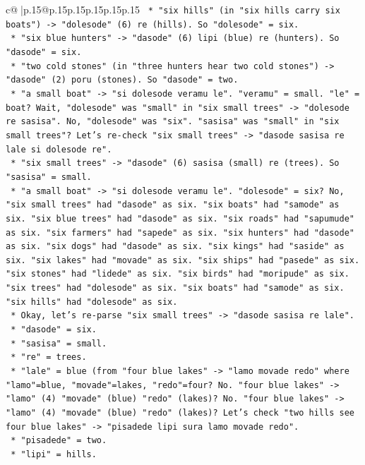 \documentclass{article}
\begin{document}
{\begin{supertabular}{c@{$\;$}|p{.15\linewidth}@{}p{.15\linewidth}p{.15\linewidth}p{.15\linewidth}p{.15\linewidth}p{.15\linewidth}}
{{{\texttt{        *   "six hills" (in "six hills carry six boats") {-}> "dolesode" (6) re (hills). So "dolesode" = six.} \\
\texttt{        *   "six blue hunters" {-}> "dasode" (6) lipi (blue) re (hunters). So "dasode" = six.} \\
\texttt{        *   "two cold stones" (in "three hunters hear two cold stones") {-}> "dasode" (2) poru (stones). So "dasode" = two.} \\
\texttt{        *   "a small boat" {-}> "si dolesode veramu le". "veramu" = small. "le" = boat? Wait, "dolesode" was "small" in "six small trees" {-}> "dolesode re sasisa". No, "dolesode" was "six". "sasisa" was "small" in "six small trees"? Let's re{-}check "six small trees" {-}> "dasode sasisa re lale si dolesode re".} \\
\texttt{            *   "six small trees" {-}> "dasode" (6) sasisa (small) re (trees). So "sasisa" = small.} \\
\texttt{            *   "a small boat" {-}> "si dolesode veramu le". "dolesode" = six? No, "six small trees" had "dasode" as six. "six boats" had "samode" as six. "six blue trees" had "dasode" as six. "six roads" had "sapumude" as six. "six farmers" had "sapede" as six. "six hunters" had "dasode" as six. "six dogs" had "dasode" as six. "six kings" had "saside" as six. "six lakes" had "movade" as six. "six ships" had "pasede" as six. "six stones" had "lidede" as six. "six birds" had "moripude" as six. "six trees" had "dolesode" as six. "six boats" had "samode" as six. "six hills" had "dolesode" as six.} \\
\texttt{            *   Okay, let's re{-}parse "six small trees" {-}> "dasode sasisa re lale".} \\
\texttt{                *   "dasode" = six.} \\
\texttt{                *   "sasisa" = small.} \\
\texttt{                *   "re" = trees.} \\
\texttt{                *   "lale" = blue (from "four blue lakes" {-}> "lamo movade redo" where "lamo"=blue, "movade"=lakes, "redo"=four? No. "four blue lakes" {-}> "lamo" (4) "movade" (blue) "redo" (lakes)? No. "four blue lakes" {-}> "lamo" (4) "movade" (blue) "redo" (lakes)? Let's check "two hills see four blue lakes" {-}> "pisadede lipi sura lamo movade redo".} \\
\texttt{                    *   "pisadede" = two.} \\
\texttt{                    *   "lipi" = hills.} \\
}}}
\end{supertabular}}
\end{document}

